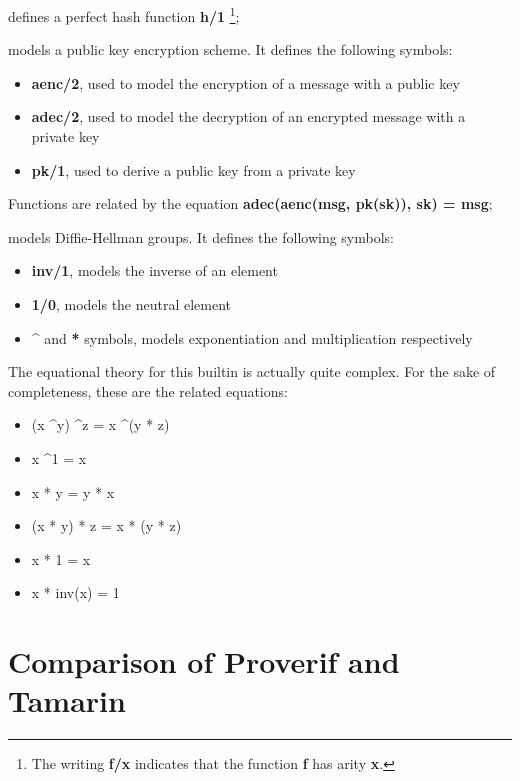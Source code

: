 \begin{description}[style=nextline]
    \item[hashing] defines a perfect hash function \textbf{h/1} \footnote{The writing \textbf{f/x} indicates that the function \textbf{f} has arity \textbf{x}.};
    \item[asymmetric-encryption] models a public key encryption scheme. It defines the following symbols:
    
    \begin{itemize}
        \item{\textbf{aenc/2}, used to model the encryption of a message with a public key}
        \item{\textbf{adec/2}, used to model the decryption of an encrypted message with a private key}
        \item{\textbf{pk/1}, used to derive a public key from a private key}
    \end{itemize}

    Functions are related by the equation \textbf{adec(aenc(msg, pk(sk)), sk) = msg};

    \item[diffie-hellman] models Diffie-Hellman groups. It defines the following symbols:
    
    \begin{itemize}
        \item{\textbf{inv/1}, models the inverse of an element}
        \item{\textbf{1/0}, models the neutral element}
        \item{\textbf{\textasciicircum} and \textbf{*} symbols, models exponentiation and multiplication respectively}
    \end{itemize}

    The equational theory for this builtin is actually quite complex. For the sake of completeness, these are the related equations:
    \begin{itemize}
        \item{(x \textasciicircum y) \textasciicircum z = x \textasciicircum (y * z)}
        \item{x \textasciicircum 1 = x}
        \item{x * y = y * x}
        \item{(x * y) * z = x * (y * z)}
        \item{x * 1 = x}
        \item{x * inv(x) = 1}
    \end{itemize}
\end{description}

\section{Comparison of Proverif and Tamarin}
